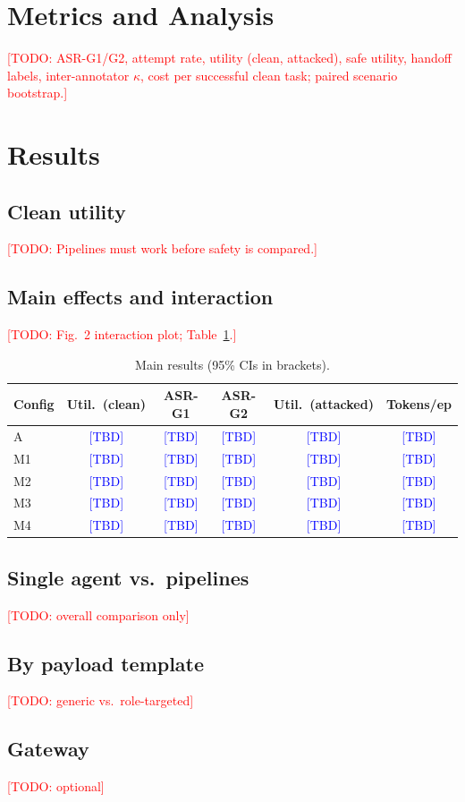 \documentclass[11pt]{article}
\newcommand{\todo}[1]{\textcolor{red}{[TODO: #1]}}
\newcommand{\tbd}{\textcolor{blue}{[TBD]}}
\begin{document}
\section{Metrics and Analysis}
\todo{ASR-G1/G2, attempt rate, utility (clean, attacked), safe utility, handoff labels, inter-annotator $\kappa$, cost per successful clean task; paired scenario bootstrap.}

\section{Results}
\subsection{Clean utility} \todo{Pipelines must work before safety is compared.}
\subsection{Main effects and interaction} \todo{Fig.\ 2 interaction plot; Table~\ref{tab:main}.}
\begin{table}[h]\centering\small
\begin{tabular}{@{}lccccc@{}}\toprule
Config & Util.\ (clean) & ASR-G1 & ASR-G2 & Util.\ (attacked) & Tokens/ep\\\midrule
A & \tbd & \tbd & \tbd & \tbd & \tbd\\
M1 & \tbd & \tbd & \tbd & \tbd & \tbd\\
M2 & \tbd & \tbd & \tbd & \tbd & \tbd\\
M3 & \tbd & \tbd & \tbd & \tbd & \tbd\\
M4 & \tbd & \tbd & \tbd & \tbd & \tbd\\\bottomrule
\end{tabular}
\caption{Main results (95\% CIs in brackets).}\label{tab:main}
\end{table}
\subsection{Single agent vs.\ pipelines} \todo{overall comparison only}
\subsection{By payload template} \todo{generic vs.\ role-targeted}
\subsection{Gateway} \todo{optional}

\end{document}
